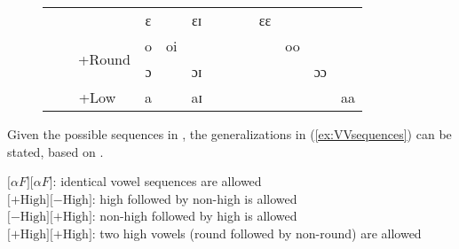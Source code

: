 \documentclass[output=paper,colorlinks,citecolor=brown]{langscibook}
\begin{document}
\begin{figure}
{\begin{tabular}{cccc|c|c|c|c|c|c|c|c|c|}
\multicolumn{1}{|c|}{} & \multicolumn{1}{c|}{} & \multicolumn{1}{c|}{} & ɛ & \cellcolor{lightgray} & ɛɪ & \cellcolor{lightgray} & \cellcolor{lightgray} & \cellcolor{lightgray} & ɛɛ & \cellcolor{lightgray} & \cellcolor{lightgray}& \cellcolor{lightgray} \\
\cline{3-4}
\multicolumn{1}{|c|}{} & \multicolumn{1}{c|}{} & \multicolumn{1}{c|}{\multirow{2}{*}{+Round}} & o & oi & \cellcolor{lightgray}& \cellcolor{lightgray}& \cellcolor{lightgray}& \cellcolor{lightgray}& \cellcolor{lightgray}& oo & \cellcolor{lightgray} & \cellcolor{lightgray} \\
\cline{4-4}
\multicolumn{1}{|c|}{} & \multicolumn{1}{c|}{} & \multicolumn{1}{c|}{} & ɔ & \cellcolor{lightgray} & ɔɪ & \cellcolor{lightgray}& \cellcolor{lightgray}& \cellcolor{lightgray}& \cellcolor{lightgray}& \cellcolor{lightgray}& ɔɔ& \cellcolor{lightgray} \\
\cline{2-4}
\multicolumn{1}{|c|}{} & \multicolumn{2}{c|}{+Low} & a & \cellcolor{lightgray} & aɪ & \cellcolor{lightgray} & \cellcolor{lightgray} & \cellcolor{lightgray} & \cellcolor{lightgray} & \cellcolor{lightgray} & \cellcolor{lightgray} & aa \\\hline
 \end{tabular}}
\end{figure}

Given the possible sequences in , the generalizations in (\ref{ex:VVsequences}) can be stated, based on \citet{Dolphyne1988}. 

\ea \label{ex:VVsequences}
\begin{xlist}
\ex $\lbrack \alpha F \rbrack \lbrack \alpha F \rbrack$: identical vowel sequences are allowed \\
\ex $\lbrack +\text{High} \rbrack \lbrack −\text{High} \rbrack $: high followed by non-high is allowed \\
\ex $\lbrack −\text{High} \rbrack \lbrack +\text{High} \rbrack $: non-high followed by high is allowed \\
\ex $\lbrack +\text{High} \rbrack \lbrack +\text{High} \rbrack $: two high vowels (round followed by non-round) are allowed \\
\end{xlist}
\z
\end{document}
